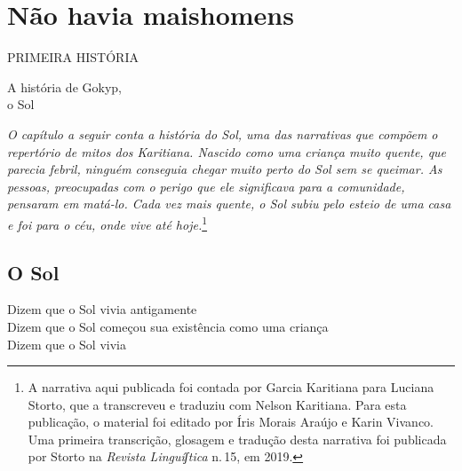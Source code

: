 \part[Não havia mais homens]{Não havia mais\break homens}


\pagebreak
\thispagestyle{empty}
\mbox{}
\begin{center}
\vspace{4cm}
{\formularlight\small PRIMEIRA HISTÓRIA}

\medskip

{\formular\huge A história de Gokyp,\\\vspace{0.2cm} o Sol}
\end{center}
\pagebreak


\thispagestyle{empty}
\mbox{}
\vfill
\noindent{}\textit{O capítulo a seguir conta a história do Sol, uma das narrativas que compõem o repertório de mitos dos Karitiana. Nascido como uma criança muito quente, que parecia febril, ninguém conseguia chegar muito perto do Sol sem se queimar. As pessoas, preocupadas com o perigo que ele significava para a comunidade, pensaram em matá-lo. Cada vez mais quente, o Sol subiu pelo esteio de uma casa e foi para o céu, onde vive até hoje.}\footnote{A narrativa aqui publicada foi contada por Garcia Karitiana para Luciana Storto, que a transcreveu e traduziu com Nelson Karitiana. Para esta publicação, o material foi editado por Íris Morais Araújo e Karin Vivanco. Uma primeira transcrição, glosagem e tradução desta narrativa foi publicada por Storto na \emph{Revista Linguíʃtica} n.\,15, em 2019.}
\pagebreak


\chapter*{O Sol}

\begin{linenumbers}\begingroup\raggedright
\noindent Dizem que o Sol vivia antigamente\\
Dizem que o Sol começou sua existência como uma criança\\
Dizem que o Sol vivia
\end{linenumbers}\endgroup

